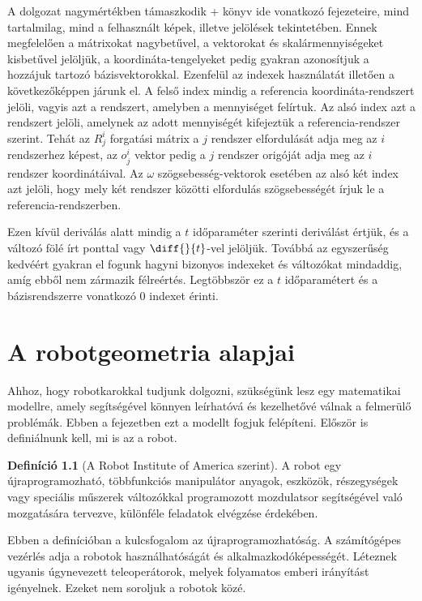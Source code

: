\documentclass[12pt,a4paper]{report}
\theoremstyle{remark}
\theoremstyle{definition}
\newtheorem{defi}{Definíció}[section]
\begin{document}
A dolgozat nagymértékben támaszkodik \az+\textcite{spong_robot} könyv ide vonatkozó fejezeteire, mind tartalmilag, 
mind a felhasznált képek, illetve jelölések tekintetében. Ennek megfelelően a mátrixokat nagybetűvel, a vektorokat 
és skalármennyiségeket kisbetűvel jelöljük, a koordináta-tengelyeket pedig gyakran azonosítjuk a hozzájuk tartozó 
bázisvektorokkal. Ezenfelül az indexek használatát illetően a következőképpen járunk el. A felső index mindig a 
referencia koordináta-rendszert jelöli, vagyis azt a rendszert, amelyben a mennyiséget felírtuk. Az alsó index azt a 
rendszert jelöli, amelynek az adott mennyiségét kifejeztük a referencia-rendszer szerint. Tehát az $R^{i}_{j}$ 
forgatási mátrix a $j$ rendszer elfordulását adja meg az $i$ rendszerhez képest, az $o^{i}_{j}$ vektor pedig a $j$ 
rendszer origóját adja meg az $i$ rendszer koordinátáival. Az $\omega$ szögsebesség-vektorok esetében az alsó két 
index azt jelöli, hogy mely két rendszer közötti elfordulás szögsebességét írjuk le a referencia-rendszerben. 

Ezen kívül deriválás alatt mindig a $t$ időparaméter szerinti deriválást értjük, és a változó fölé írt ponttal vagy 
$\diff{}{t}$-vel jelöljük. Továbbá az egyszerűség kedvéért gyakran el fogunk hagyni bizonyos indexeket és változókat 
mindaddig, amíg ebből nem zármazik félreértés. Legtöbbször ez a $t$ időparamétert és a bázisrendszerre vonatkozó $0$ 
indexet érinti.

\chapter{A robotgeometria alapjai}
Ahhoz, hogy robotkarokkal tudjunk dolgozni, szükségünk lesz egy matematikai modellre, amely segítségével könnyen 
leírhatóvá és kezelhetővé válnak a felmerülő problémák. Ebben a fejezetben ezt a modellt fogjuk felépíteni. Először 
is definiálnunk kell, mi is az a robot.

\begin{defi}[A Robot Institute of America szerint]
A robot egy újraprogramozható, többfunkciós manipulátor anyagok, eszközök, részegységek vagy speciális műszerek 
változókkal programozott mozdulatsor segítségével való mozgatására tervezve, különféle feladatok elvégzése 
érdekében.
\end{defi}

Ebben a definícióban a kulcsfogalom az újraprogramozhatóság. A számítógépes vezérlés adja a robotok 
használhatóságát és alkalmazkodóképességét. Léteznek ugyanis úgynevezett teleoperátorok, melyek folyamatos emberi 
irányítást igényelnek. Ezeket nem soroljuk a robotok közé.
\end{document}
